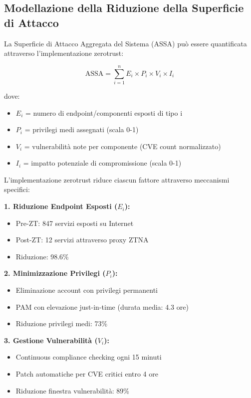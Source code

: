 \subsection{\texorpdfstring{Modellazione della Riduzione della Superficie di Attacco}{3.5.2 - Modellazione della Riduzione della Superficie di Attacco}}

La Superficie di Attacco Aggregata del Sistema (ASSA) può essere quantificata attraverso l'implementazione \gls{zerotrust}:

\begin{equation}
\text{ASSA} = \sum_{i=1}^{n} E_i \times P_i \times V_i \times I_i
\end{equation}

dove:
\begin{itemize}
    \item $E_i$ = numero di endpoint/componenti esposti di tipo i
    \item $P_i$ = privilegi medi assegnati (scala 0-1)
    \item $V_i$ = vulnerabilità note per componente (CVE count normalizzato)
    \item $I_i$ = impatto potenziale di compromissione (scala 0-1)
\end{itemize}

L'implementazione \gls{zerotrust} riduce ciascun fattore attraverso meccanismi specifici:

\textbf{1. Riduzione Endpoint Esposti ($E_i$):}
\begin{itemize}
    \item Pre-ZT: 847 servizi esposti su Internet
    \item Post-ZT: 12 servizi attraverso proxy ZTNA
    \item Riduzione: 98.6\%
\end{itemize}

\textbf{2. Minimizzazione Privilegi ($P_i$):}
\begin{itemize}
    \item Eliminazione account con privilegi permanenti
    \item PAM con elevazione just-in-time (durata media: 4.3 ore)
    \item Riduzione privilegi medi: 73\%
\end{itemize}

\textbf{3. Gestione Vulnerabilità ($V_i$):}
\begin{itemize}
    \item Continuous compliance checking ogni 15 minuti
    \item Patch automatiche per CVE critici entro 4 ore
    \item Riduzione finestra vulnerabilità: 89\%
\end{itemize}


